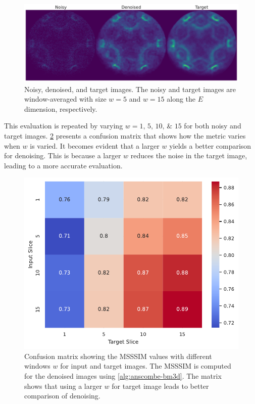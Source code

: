 \begin{figure}
    \centering
    \includegraphics[width=1\linewidth]{images/noisy_denoised_ref_16M_avg_bm3d.pdf}
    \caption{Noisy, denoised, and target images. The noisy and target images are window-averaged with size $w=5$ and $w=15$ along the $E$ dimension, respectively.}
    \label{fig:noisy-denoised-ref-16M-avg-bm3d}
\end{figure}

This evaluation is repeated by varying $w = \numlist{1;5;10;15}$  for both noisy and target images. \cref{fig:confusion_matrix_msssim_window_avg} presents a confusion matrix that shows how the metric varies when $w$ is varied. It becomes evident that a larger $w$ yields a better comparison for denoising. This is because a larger $w$ reduces the noise in the target image, leading to a more accurate evaluation.

\begin{figure}
    \centering
    \includegraphics[width=0.5\linewidth]{images/confusion_matrix_msssim_window_avg.pdf}
    \caption{Confusion matrix showing the \gls{MSSSIM} values with different windows $w$ for input and target images. The \gls{MSSSIM} is computed for the denoised images using \cref{alg:anscombe-bm3d}. The matrix shows that using a larger $w$ for target image leads to better comparison of denoising.}
    \label{fig:confusion_matrix_msssim_window_avg}
\end{figure}

